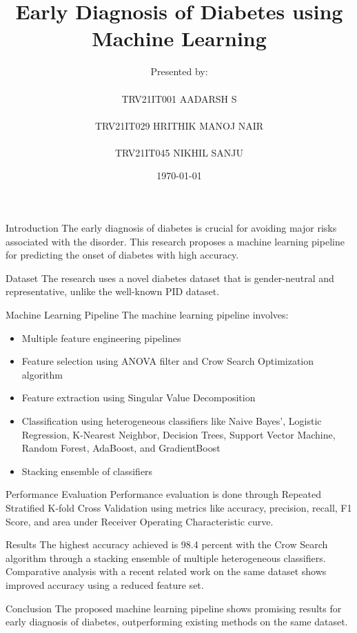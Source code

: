 \documentclass{beamer}
\title{Early Diagnosis of Diabetes using Machine Learning}
\author{Presented by:\\\\
TRV21IT001 AADARSH S\\\\
TRV21IT029 HRITHIK MANOJ NAIR\\\\
TRV21IT045 NIKHIL SANJU}
\date{\today}
\begin{document}
\begin{frame}
\titlepage
\end{frame}

\begin{frame}{Introduction}
The early diagnosis of diabetes is crucial for avoiding major risks associated with the disorder. This research proposes a machine learning pipeline for predicting the onset of diabetes with high accuracy.
\end{frame}

\begin{frame}{Dataset}
The research uses a novel diabetes dataset that is gender-neutral and representative, unlike the well-known PID dataset.
\end{frame}

\begin{frame}{Machine Learning Pipeline}
The machine learning pipeline involves:
\begin{itemize}
    \item Multiple feature engineering pipelines
    \item Feature selection using ANOVA filter and Crow Search Optimization algorithm
    \item Feature extraction using Singular Value Decomposition
    \item Classification using heterogeneous classifiers like Naive Bayes', Logistic Regression, K-Nearest Neighbor, Decision Trees, Support Vector Machine, Random Forest, AdaBoost, and GradientBoost
    \item Stacking ensemble of classifiers
\end{itemize}
\end{frame}

\begin{frame}{Performance Evaluation}
Performance evaluation is done through Repeated Stratified K-fold Cross Validation using metrics like accuracy, precision, recall, F1 Score, and area under Receiver Operating Characteristic curve.
\end{frame}

\begin{frame}{Results}
The highest accuracy achieved is 98.4 percent with the Crow Search algorithm through a stacking ensemble of multiple heterogeneous classifiers. Comparative analysis with a recent related work on the same dataset shows improved accuracy using a reduced feature set.
\end{frame}

\begin{frame}{Conclusion}
The proposed machine learning pipeline shows promising results for early diagnosis of diabetes, outperforming existing methods on the same dataset.
\end{frame}
\end{document}
